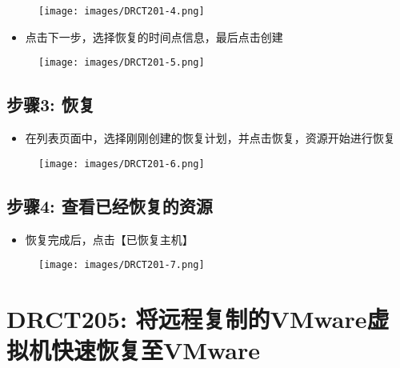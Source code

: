\begin{figure}[htbp]
\centering
\texttt{[image: images/DRCT201-4.png]}
\end{figure}

\begin{itemize}
\item 点击下一步，选择恢复的时间点信息，最后点击创建

\end{itemize}

\begin{figure}[htbp]
\centering
\texttt{[image: images/DRCT201-5.png]}
\end{figure}

\subsection{步骤3: 恢复}
\label{步骤3:恢复}

\begin{itemize}
\item 在列表页面中，选择刚刚创建的恢复计划，并点击恢复，资源开始进行恢复

\end{itemize}

\begin{figure}[htbp]
\centering
\texttt{[image: images/DRCT201-6.png]}
\end{figure}

\subsection{步骤4: 查看已经恢复的资源}
\label{步骤4:查看已经恢复的资源}

\begin{itemize}
\item 恢复完成后，点击【已恢复主机】

\end{itemize}

\begin{figure}[htbp]
\centering
\texttt{[image: images/DRCT201-7.png]}
\end{figure}

\section{DRCT205: 将远程复制的VMware虚拟机快速恢复至VMware}
\label{drct205:将远程复制的vmware虚拟机快速恢复至vmware}

